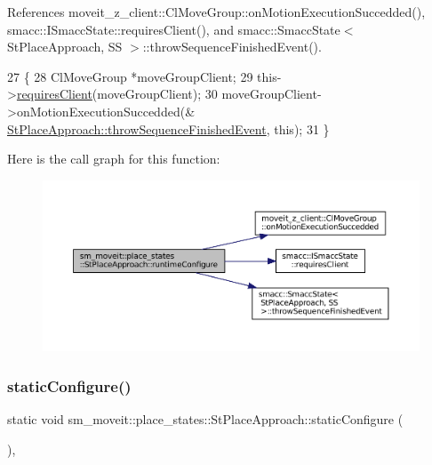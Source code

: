 References moveit\+\_\+z\+\_\+client\+::\+Cl\+Move\+Group\+::on\+Motion\+Execution\+Succedded(), smacc\+::\+I\+Smacc\+State\+::requires\+Client(), and smacc\+::\+Smacc\+State$<$ St\+Place\+Approach, S\+S $>$\+::throw\+Sequence\+Finished\+Event().


\begin{DoxyCode}
27     \{
28         ClMoveGroup *moveGroupClient;
29         this->\hyperlink{classsmacc_1_1ISmaccState_a7f95c9f0a6ea2d6f18d1aec0519de4ac}{requiresClient}(moveGroupClient);
30         moveGroupClient->onMotionExecutionSuccedded(&
      \hyperlink{classsmacc_1_1SmaccState_a49dcfc25824f7e083dd4b999c49ab2b6}{StPlaceApproach::throwSequenceFinishedEvent}, \textcolor{keyword}{this});
31     \}
\end{DoxyCode}
Here is the call graph for this function\+:
\nopagebreak
\begin{figure}[H]
\begin{center}
\leavevmode
\includegraphics[width=350pt]{structsm__moveit_1_1place__states_1_1StPlaceApproach_a287b39f8eb6a5aca4f0b1e63cb275f7a_cgraph}
\end{center}
\end{figure}
\mbox{\label{structsm__moveit_1_1place__states_1_1StPlaceApproach_a18cfb69a3268faad24cd10e4d1ff8877}} 
\subsubsection{\texorpdfstring{static\+Configure()}{staticConfigure()}}
{\footnotesize\ttfamily static void sm\+\_\+moveit\+::place\+\_\+states\+::\+St\+Place\+Approach\+::static\+Configure (\begin{DoxyParamCaption}{ }\end{DoxyParamCaption})\hspace{0.3cm}{\ttfamily [inline]}, {\ttfamily [static]}}



